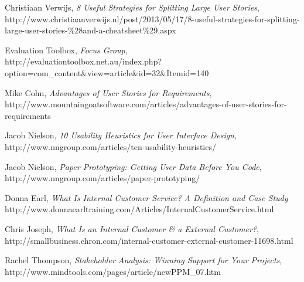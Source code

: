\documentclass[10pt, a4paper]{article}
\begin{document}
\begin{thebibliography}{9}

  Christiaan Verwijs, 
  \emph{8 Useful Strategies for Splitting Large User Stories},
  \\ http://www.christiaanverwijs.nl/post/2013/05/17/8-useful-strategies-for-splitting-large-user-stories-{\%}28and-a-cheatsheet{\%}29.aspx

  Evaluation Toolbox, 
  \emph{Focus Group},
  \\ http://evaluationtoolbox.net.au/index.php?option=com{\_}content{\&}view=article{\&}id=32{\&}Itemid=140

  Mike Cohn, 
  \emph{Advantages of User Stories for Requirements}, 
  \\ http://www.mountaingoatsoftware.com/articles/advantages-of-user-stories-for-requirements

  Jacob Nielson, 
  \emph{10 Usability Heuristics for User Interface Design},
  \\ http://www.nngroup.com/articles/ten-usability-heuristics/

  Jacob Nielson, 
  \emph{Paper Prototyping: Getting User Data Before You Code},
  \\ http://www.nngroup.com/articles/paper-prototyping/

  Donna Earl, 
  \emph{What Is Internal Customer Service? A Definition and Case Study}
  \\ http://www.donnaearltraining.com/Articles/InternalCustomerService.html

  Chris Joseph, 
  \emph{What Is an Internal Customer {\&} a External Customer?},
  \\ http://smallbusiness.chron.com/internal-customer-external-customer-11698.html

  Rachel Thompson, 
  \emph{Stakeholder Analysis: Winning Support for Your Projects},
  \\ http://www.mindtools.com/pages/article/newPPM{\_}07.htm

\end{thebibliography}
\end{document}
